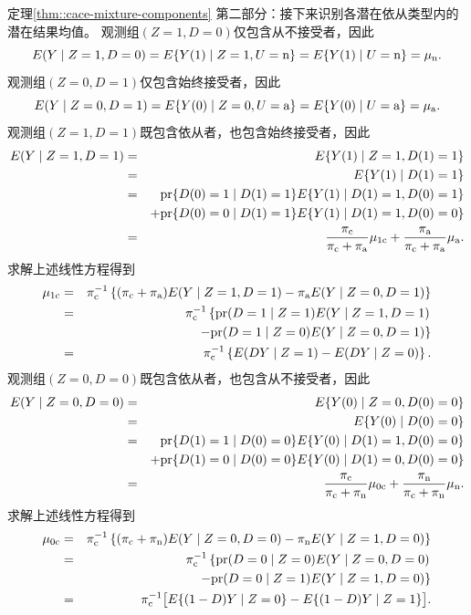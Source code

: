 \begin{myproof}{定理}{\ref{thm::cace-mixture-components}}
第二部分：接下来识别各潜在依从类型内的潜在结果均值。 
观测组$(Z=1,D=0)$仅包含从不接受者，因此$$
E(Y\mid Z=1, D=0) = E\{  Y(1) \mid Z=1, U=\textup{n} \} = E\{  Y(1) \mid   U=\textup{n} \}  =
\mu_{\textup{n}}  . 
$$观测组$(Z=0,D=1)$仅包含始终接受者，因此$$
E(Y\mid Z=0, D=1) = E\{  Y(0) \mid Z=0, U=\textup{a} \} = E\{  Y(0) \mid   U=\textup{a} \}  =
\mu_{\textup{a}} . 
$$观测组$(Z=1,D=1)$既包含依从者，也包含始终接受者，因此\begin{eqnarray*}
E(Y\mid Z=1, D=1) &=& E\{ Y(1)\mid Z=1, D(1)=1\} \\
&=& E\{ Y(1)\mid D(1)=1\}  \\   
&=& \textup{pr}\{  D(0)=1 \mid D(1)=1 \} E\{ Y(1)\mid D(1)=1, D(0)=1\}  \\
&&+ \textup{pr}\{  D(0)=0 \mid D(1)=1 \}E\{ Y(1)\mid D(1)=1, D(0)=0\}   \\
&=& \frac{\pi_{\textup{c}}}{\pi_{\textup{c}} + \pi_{\textup{a}}} \mu_{1\textup{c}} +  \frac{\pi_{\textup{a}}}{\pi_{\textup{c}} + \pi_{\textup{a}}} \mu_{\textup{a}}.
\end{eqnarray*}求解上述线性方程得到\begin{eqnarray*}
\mu_{1\textup{c}} &=& \pi_{\textup{c}}^{-1} \left\{  (\pi_{\textup{c}} + \pi_{\textup{a}})  E(Y\mid Z=1, D=1)  - \pi_{\textup{a}}    E(Y\mid Z=0, D=1)    \right\} \\
&=& \pi_{\textup{c}}^{-1} \left\{  \textup{pr}(D=1\mid Z=1)  E(Y\mid Z=1, D=1) \right.\\
&&\left. \qquad  -\textup{pr}(D=1\mid Z=0) E(Y\mid Z=0, D=1)    \right\} \\
&=&  \pi_{\textup{c}}^{-1}\left\{   E(DY\mid Z=1 )  -  E(DY\mid Z=0)    \right\}.
\end{eqnarray*}观测组$(Z=0,D=0)$既包含依从者，也包含从不接受者，因此\begin{eqnarray*}
E(Y\mid Z=0,D=0) &=& E\{ Y(0)\mid Z=0, D(0)=0\} \\
&=& E\{ Y(0)\mid D(0)=0\} \\ 
&=& \textup{pr}\{  D(1)=1 \mid D(0)=0 \} E\{ Y(0)\mid D(1)=1, D(0)=0\}  \\
&&+ \textup{pr}\{  D(1)=0 \mid D(0)= 0\}E\{ Y(0)\mid D(1)=0, D(0)=0\}   \\
&=& \frac{\pi_{\textup{c}}}{\pi_{\textup{c}} + \pi_{\textup{n}}} \mu_{0\textup{c}} +  \frac{\pi_{\textup{n}}}{\pi_{\textup{c}} + \pi_{\textup{n}}} \mu_{\textup{n}}.
\end{eqnarray*}求解上述线性方程得到\begin{eqnarray*}
\mu_{0\textup{c}}  &=& \pi_{\textup{c}}^{-1} \left\{  (\pi_{\textup{c}} + \pi_{\textup{n}})  E(Y\mid Z=0, D=0)  - \pi_{\textup{n}}    E(Y\mid Z=1, D=0)    \right\} \\
&=& \pi_{\textup{c}}^{-1} \left\{ \textup{pr}(D=0\mid Z=0)  E(Y\mid Z=0, D=0)  \right.\\
&&\left. \qquad  -\textup{pr}(D=0\mid Z=1)   E(Y\mid Z=1, D=0)    \right\} \\
&=& \pi_{\textup{c}}^{-1} \big[   E\{ (1-D)Y\mid Z=0 \}  -  E\{(1-D)Y\mid Z=1 \}    \big]. 
\end{eqnarray*}
\end{myproof}

